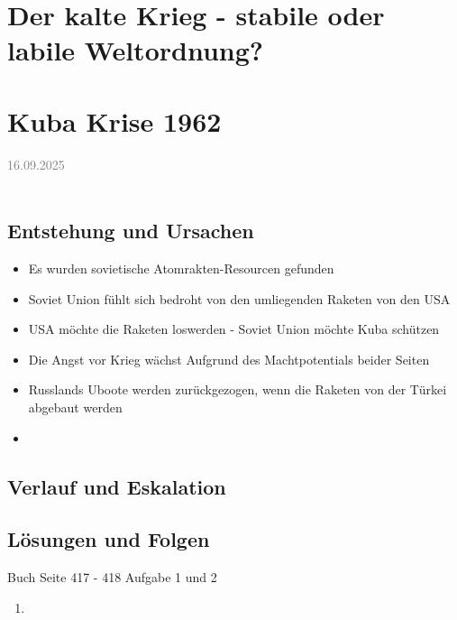 \documentclass[11pt,a4paper,oneside]{article}
\newcommand{\lessondate}[1]{
	\noindent\hfill\textcolor{gray}{\textsc{#1}} \\
	\vspace{0.5cm}
}
\begin{document}
	
	
	
	\section{Der kalte Krieg - stabile oder labile Weltordnung?}
	
	\newpage
	\section{Kuba Krise 1962}
	\lessondate{16.09.2025}\\
	
	\subsection{Entstehung und Ursachen}
	\begin{itemize}
		\item Es wurden sovietische Atomrakten-Resourcen  gefunden 
		\item Soviet Union fühlt sich bedroht von den umliegenden Raketen von den USA 
		\item USA möchte die Raketen loswerden - Soviet Union möchte Kuba schützen 
		\item Die Angst vor Krieg wächst Aufgrund des Machtpotentials beider Seiten
		\item Russlands Uboote werden zurückgezogen, wenn die Raketen von der Türkei abgebaut werden 
		\item 
	\end{itemize}
	
	\subsection{Verlauf und Eskalation}
	
	\subsection{Lösungen und Folgen}
	
	

	\newpage	
	
	
	\begin{histaufgabe}{Buch Seite 417 - 418 Aufgabe 1 und 2}
		\begin{enumerate}
			\item 
		\end{enumerate}
	\end{histaufgabe}
	
	
	\newpage
	
\end{document}

